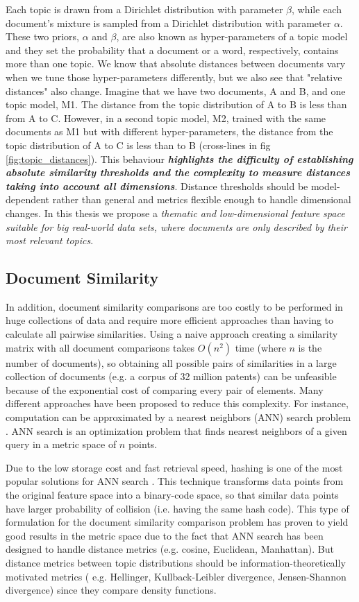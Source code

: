 Each topic is drawn from a Dirichlet distribution with parameter $\beta$, while each document's mixture is sampled from a Dirichlet distribution with parameter $\alpha$. These two priors, $\alpha$ and $\beta$, are also known as hyper-parameters of a topic model and they set the probability that a document or a word, respectively, contains more than one topic. We know that absolute distances between documents vary when we tune those hyper-parameters differently, but we also see that "relative distances" also change. Imagine that we have two documents, A and B, and one topic model, M1. The distance from the topic distribution of A to B is less than from A to C. However, in a second topic model, M2, trained with the same documents as M1 but with different hyper-parameters, the distance from the topic distribution of A to C is less than to B (cross-lines in fig \ref{fig:topic_distances}). This behaviour \textbf{\textit{highlights the difficulty of establishing absolute similarity thresholds and the complexity to measure distances taking into account all dimensions}}. Distance thresholds should be model-dependent rather than general and metrics flexible enough to handle dimensional changes. In this thesis we propose a \textit{thematic and low-dimensional feature space suitable for big real-world data sets, where documents are only described by their most relevant topics}.


\subsection{Document Similarity}

In addition, document similarity comparisons are too costly to be performed in huge collections of data and require more efficient approaches than having to calculate all pairwise similarities. Using a naive approach creating a similarity matrix with all document comparisons takes $O(n^2)$ time (where $n$ is the number of documents), so obtaining all possible pairs of similarities in a large collection of documents (e.g. a corpus of 32 million patents) can be unfeasible because of the exponential cost of comparing every pair of elements. Many different approaches have been proposed to reduce this complexity. For instance, computation can be approximated by a nearest neighbors (ANN) search problem \citep{Indyk1998}. ANN search is an optimization problem that finds nearest neighbors of a given query in a metric space of $n$ points. 

Due to the low storage cost and fast retrieval speed, hashing is one of the most popular solutions for ANN search \citep{Zhen2016}. This technique transforms data points from the original feature space into a binary-code space, so that similar data points have larger probability of collision (i.e. having the same hash code). This type of formulation for the document similarity comparison problem has proven to yield good results in the metric space \citep{Krstovski2011} due to the fact that ANN search has been designed to handle distance metrics (e.g. cosine, Euclidean, Manhattan). But distance metrics between topic distributions should be information-theoretically motivated metrics ( e.g. Hellinger, Kullback-Leibler divergence, Jensen-Shannon divergence) since they compare density functions. 

